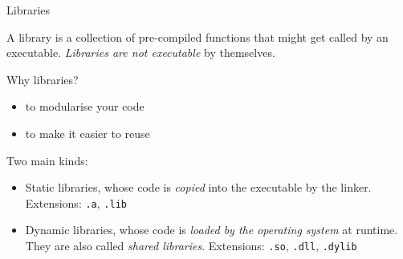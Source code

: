 \documentclass[compress]{beamer}
\begin{document}
\begin{frame}{Libraries}

    A library is a collection of pre-compiled functions that might get called by
    an executable. \emph{Libraries are not executable} by themselves.

    \begin{exampleblock}{Why libraries?}
        \begin{itemize}
            \item to modularise your code
            \item to make it easier to reuse
        \end{itemize}
    \end{exampleblock}

    \pause

    Two main kinds:

    \begin{itemize}
        \item Static libraries, whose code is \emph{copied} into the executable
            by the linker. Extensions: \texttt{.a}, \texttt{.lib}
        \item Dynamic libraries, whose code is \emph{loaded by the operating
            system} at runtime. They are also called \emph{shared libraries}.
            Extensions: \texttt{.so}, \texttt{.dll}, \texttt{.dylib}
    \end{itemize}

\end{frame}
\end{document}
